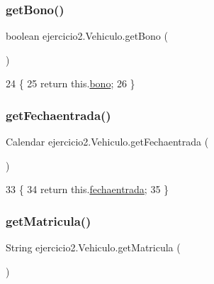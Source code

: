 \subsubsection{\texorpdfstring{get\+Bono()}{getBono()}}
{\footnotesize\ttfamily boolean ejercicio2.\+Vehiculo.\+get\+Bono (\begin{DoxyParamCaption}{ }\end{DoxyParamCaption})\hspace{0.3cm}{\ttfamily [inline]}}


\begin{DoxyCode}
24                              \{
25         \textcolor{keywordflow}{return} this.\mbox{\hyperlink{classejercicio2_1_1_vehiculo_a389cff48d0624a033052cc0bb27aff16}{bono}};
26     \}
\end{DoxyCode}
\mbox{\label{classejercicio2_1_1_vehiculo_a3ac04e0b44563c07b8aae4126ce07dc4}} 
\subsubsection{\texorpdfstring{get\+Fechaentrada()}{getFechaentrada()}}
{\footnotesize\ttfamily Calendar ejercicio2.\+Vehiculo.\+get\+Fechaentrada (\begin{DoxyParamCaption}{ }\end{DoxyParamCaption})\hspace{0.3cm}{\ttfamily [inline]}}


\begin{DoxyCode}
33                                      \{
34         \textcolor{keywordflow}{return} this.\mbox{\hyperlink{classejercicio2_1_1_vehiculo_a6358d487f847acdf071ab9612ae92cf2}{fechaentrada}};
35     \}
\end{DoxyCode}
\mbox{\label{classejercicio2_1_1_vehiculo_a5dd89b85bb4c8a9da01224fea2b754f0}} 
\subsubsection{\texorpdfstring{get\+Matricula()}{getMatricula()}}
{\footnotesize\ttfamily String ejercicio2.\+Vehiculo.\+get\+Matricula (\begin{DoxyParamCaption}{ }\end{DoxyParamCaption})\hspace{0.3cm}{\ttfamily [inline]}}


